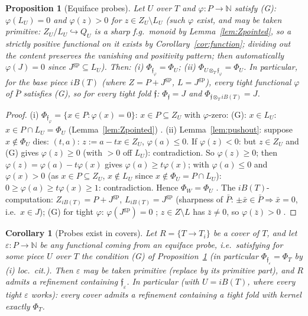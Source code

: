 \documentclass[11pt]{article}
\newtheorem{proposition}[theorem]{Proposition}
\newtheorem{corollary}[theorem]{Corollary}
\theoremstyle{definition}
\newcommand{\gp}{\mathrm{gp}}
\begin{document}
\begin{proposition}[Equiface probes]\label{prop:equiface}
Let $U$ over $T$ and $\varphi:P\to\mathbb N$ satisfy
\textup{(}G\textup{)}: $\varphi(L_U)=0$ and $\varphi(z)>0$ for
$z\in Z_U\setminus L_U$ \textup{(}such $\varphi$ exist, and may be
taken \emph{primitive}: $Z_U/L_U\hookrightarrow Q_U$ is a sharp f.g.\
monoid by Lemma~\textup{\ref{lem:Zpointed}}, so a strictly positive
functional on it exists by Corollary~\textup{\ref{cor:function}};
dividing out the content preserves the vanishing and positivity
pattern; then automatically
$\varphi(J)=0$ since $J^{\gp}\subseteq L_U$\textup{)}. Then:
\textup{(}i\textup{)} $\Phi_{\mathfrak f_\varphi}=\Phi_U$;
\textup{(}ii\textup{)} $\Phi_{U\otimes_T\mathfrak f_\varphi}=\Phi_U$.
In particular, for the base piece $iB(T)$ \textup{(}where
$Z=P+J^{\gp}$, $L=J^{\gp}$\textup{)}, \emph{every} tight functional
$\varphi$ of $\bar P$ satisfies \textup{(}G\textup{)}, so for every
tight fold $\mathfrak f$:
$\Phi_{\mathfrak f}=J$ and
$\Phi_{\mathfrak f\otimes_T iB(T)}=J$.
\end{proposition}

\begin{proof}
(i) $\Phi_{\mathfrak f_\varphi}=\{x\in P:\varphi(x)=0\}$: $x\in P
\subseteq Z_U$ with $\varphi$-zero: (G): $x\in L_U$: $x\in
P\cap L_U=\Phi_U$ (Lemma~\ref{lem:Zpointed}) \checkmark.
(ii) Lemma~\ref{lem:pushout}: suppose $x\notin\Phi_U$ dies: $(t,a)$:
$z:=a-tx\in Z_U$, $\varphi(a)\le0$. If $\varphi(z)<0$: but $z\in
Z_U$ and (G) gives $\varphi(z)\ge0$ (with $>0$ off $L_U$):
contradiction. So $\varphi(z)\ge0$; then
$\varphi(z)=\varphi(a)-t\varphi(x)$ gives
$\varphi(a)\ge t\varphi(x)$; with $\varphi(a)\le 0$ and
$\varphi(x)>0$ (as $x\in P\subseteq Z_U$, $x\notin L_U$ since
$x\notin\Phi_U=P\cap L_U$): $0\ge\varphi(a)\ge t\varphi(x)\ge1$:
contradiction. Hence $\Phi_W=\Phi_U$ \checkmark.
The $iB(T)$-computation: $Z_{iB(T)}=P+J^{\gp}$,
$L_{iB(T)}=J^{\gp}$ \checkmark (sharpness of $\bar P$: $\pm\bar x\in\bar P\Rightarrow
\bar x=0$, i.e.\ $x\in J$); (G) for tight $\varphi$:
$\varphi(J^{\gp})=0$ \checkmark; $z\in Z\setminus L$ has $\bar z\ne0$, so
$\varphi(\bar z)>0$ \checkmark.
\end{proof}

\begin{corollary}[Probes exist in covers]\label{cor:probecover}
Let $R=\{T\to T_i\}$ be a cover of $T$, and let
$\varepsilon:P\to\mathbb N$ be any functional \emph{coming from an
equiface probe}, i.e.\ satisfying for some piece $U$ over $T$ the
condition \textup{(}G\textup{)} of
Proposition~\textup{\ref{prop:equiface}}
\textup{(}in particular $\Phi_{\mathfrak f_\varepsilon}=\Phi_T$
by \textup{(}i\textup{)} loc.\ cit.\textup{)}. Then $\varepsilon$ may be
taken primitive \textup{(}replace by its primitive
part\textup{)}, and $R$ admits a refinement containing
$\mathfrak f_\varepsilon$. In particular
\textup{(}with $U=iB(T)$, where every tight $\varepsilon$
works\textup{)}: every cover admits a refinement containing a tight
fold with kernel exactly $\Phi_T$.
\end{corollary}
\end{document}
